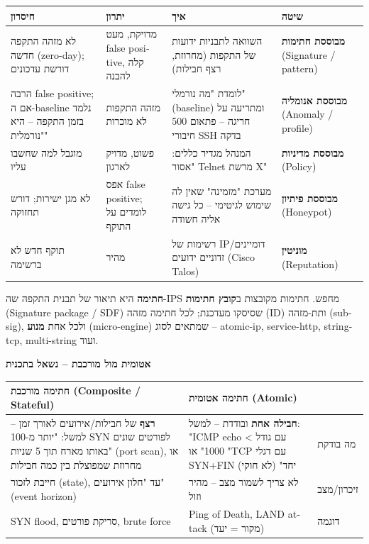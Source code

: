\documentclass[11pt]{article}
\newcommand{\enLR}[1]{\textenglish{#1}}
\newcommand{\sectionheading}[1]{\vskip10pt\penalty-200{\large\bfseries\color{h2}#1\par}\vskip3pt}
\newcommand{\subheading}[1]{\vskip6pt{\bfseries\color{h3}#1\par}\vskip2pt}
\begin{document}
\begin{xltabular}{\linewidth}{|>{\setRTL\raggedleft\arraybackslash}X|>{\setRTL\raggedleft\arraybackslash}X|>{\setRTL\raggedleft\arraybackslash}X|>{\setRTL\raggedleft\arraybackslash}X|}
\hline
{}\textbf{חיסרון} & \textbf{יתרון} & \textbf{איך} & \textbf{שיטה} \\
\hline
\endhead
לא מזהה התקפה חדשה \enLR{(zero-day)}; דורשת עדכונים & מדויקת, מעט \enLR{false positive}, קלה להבנה & השוואה לתבניות ידועות של התקפות (מחרוזת, רצף חבילות) & \textbf{מבוססת חתימות} \enLR{(Signature / pattern)} \\
\hline
הרבה \enLR{false positive}; אם ה-\enLR{baseline} נלמד בזמן התקפה – היא "נורמלית" & מזהה התקפות לא מוכרות & לומדת "מה נורמלי" \enLR{(baseline)} ומתריעה על חריגה – פתאום \enLR{500} חיבורי \enLR{SSH} בדקה & \textbf{מבוססת אנומליה} \enLR{(Anomaly / profile)} \\
\hline
מוגבל למה שחשבו עליו & פשוט, מדויק לארגון & המנהל מגדיר כללים: "אסור \enLR{Telnet} מרשת \enLR{X"} & \textbf{מבוססת מדיניות} \enLR{(Policy)} \\
\hline
לא מגן ישירות; דורש תחזוקה & אפס \enLR{false positive}; לומדים על התוקף & מערכת "מזמינה" שאין לה שימוש לגיטימי – כל גישה אליה חשודה & \textbf{מבוססת פיתיון} \enLR{(Honeypot)} \\
\hline
תוקף חדש לא ברשימה & מהיר & רשימות של \enLR{IP}/דומיינים זדוניים ידועים \enLR{(Cisco Talos)} & \textbf{מוניטין} \enLR{(Reputation)} \\
\hline
\end{xltabular}

\sectionheading{\enLR{5.5} חתימות \enLR{(Signatures)}}

\textbf{חתימה} היא תיאור של תבנית התקפה שה-\enLR{IPS} מחפש. חתימות מקובצות ב\textbf{קובץ חתימות} \enLR{(Signature package / SDF)} שסיסקו מעדכנת; לכל חתימה מזהה \enLR{(ID)} ותת-מזהה \enLR{(subsig)}, ולכל אחת \textbf{מנוע} \enLR{(micro-engine)} שמתאים לסוג – \enLR{atomic-ip, service-http, string-tcp, multi-string} ועוד.\par

\subheading{אטומית מול מורכבת – נשאל בתכנית}

\begin{xltabular}{\linewidth}{|>{\setRTL\raggedleft\arraybackslash}X|>{\setRTL\raggedleft\arraybackslash}X|>{\setRTL\raggedleft\arraybackslash}X|}
\hline
{}\textbf{חתימה מורכבת \enLR{(Composite / Stateful)}} & \textbf{חתימה אטומית \enLR{(Atomic)}} & \textbf{} \\
\hline
\endhead
\textbf{רצף} של חבילות/אירועים לאורך זמן – למשל: "יותר מ-\enLR{100 SYN} לפורטים שונים באותו מארח תוך \enLR{5} שניות" \enLR{(port scan)}, או מחרוזת שמפוצלת בין כמה חבילות & \textbf{חבילה אחת} ובודדת – למשל: "\enLR{ICMP echo} עם גודל > \enLR{1000"} או "\enLR{TCP} עם דגלי \enLR{SYN+FIN} יחד" (לא חוקי) & מה בודקת \\
\hline
חייבת לזכור \enLR{(state)}, עד "חלון אירועים" \enLR{(event horizon)} & לא צריך לשמור מצב – מהיר וזול & זיכרון/מצב \\
\hline
\enLR{SYN flood}, סריקת פורטים, \enLR{brute force} & \enLR{Ping of Death, LAND attack} (מקור = יעד) & דוגמה \\
\hline
\end{xltabular}
\end{document}
